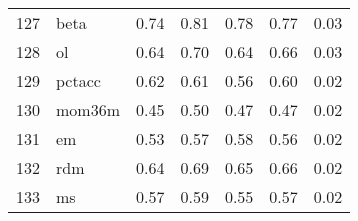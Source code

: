 \documentclass[12pt]{article}
\begin{document}
\begin{footnotesize}
\begin{longtable}{rl|c|c|c|c|c}
127 & beta             & 0.74                                                                                      & 0.81                                                                                        & 0.78                                                                                         & 0.77 & 0.03               \\
128 & ol               & 0.64                                                                                      & 0.70                                                                                        & 0.64                                                                                         & 0.66 & 0.03               \\
129 & pctacc           & 0.62                                                                                      & 0.61                                                                                        & 0.56                                                                                         & 0.60 & 0.02               \\
130 & mom36m           & 0.45                                                                                      & 0.50                                                                                        & 0.47                                                                                         & 0.47 & 0.02               \\
131 & em               & 0.53                                                                                      & 0.57                                                                                        & 0.58                                                                                         & 0.56 & 0.02               \\
132 & rdm              & 0.64                                                                                      & 0.69                                                                                        & 0.65                                                                                         & 0.66 & 0.02               \\
133 & ms               & 0.57                                                                                      & 0.59                                                                                        & 0.55                                                                                         & 0.57 & 0.02               \\

\end{longtable}
\end{footnotesize}
\end{document}
